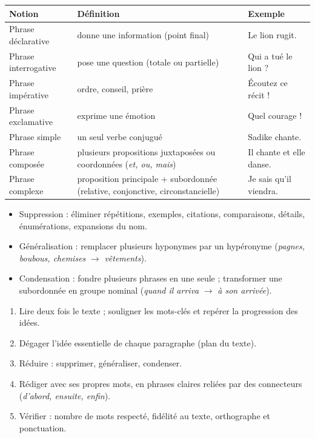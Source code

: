 \documentclass[11pt]{article}
\newcommand{\cle}[1]{{\popxbold\color{popdark}#1}}
\begin{document}
\begin{aretenir}
\begin{center}
\begin{tabularx}{\linewidth}{|l|X|X|}
\hline
\rowcolor{popblueL} \textbf{Notion} & \textbf{Définition} & \textbf{Exemple} \\
\hline
Phrase déclarative & donne une information (point final) & Le lion rugit. \\
\hline
Phrase interrogative & pose une question (totale ou partielle) & Qui a tué le lion ? \\
\hline
Phrase impérative & ordre, conseil, prière & Écoutez ce récit ! \\
\hline
Phrase exclamative & exprime une émotion & Quel courage ! \\
\hline
Phrase simple & un seul verbe conjugué & Sadike chante. \\
\hline
Phrase composée & plusieurs propositions juxtaposées ou coordonnées (\emph{et, ou, mais}) & Il chante et elle danse. \\
\hline
Phrase complexe & proposition principale + subordonnée (relative, conjonctive, circonstancielle) & Je sais qu'il viendra. \\
\hline
\end{tabularx}
\end{center}
\end{aretenir}

\begin{aretenir}
\begin{itemize}
  \item \cle{Suppression} : éliminer répétitions, exemples, citations, comparaisons, détails, énumérations, expansions du nom.
  \item \cle{Généralisation} : remplacer plusieurs hyponymes par un hypéronyme (\emph{pagnes, boubous, chemises} $\rightarrow$ \emph{vêtements}).
  \item \cle{Condensation} : fondre plusieurs phrases en une seule ; transformer une subordonnée en groupe nominal (\emph{quand il arriva} $\rightarrow$ \emph{à son arrivée}).
\end{itemize}
\end{aretenir}

\begin{methode}
\begin{enumerate}
  \item Lire deux fois le texte ; souligner les mots-clés et repérer la progression des idées.
  \item Dégager l'idée essentielle de chaque paragraphe (plan du texte).
  \item Réduire : supprimer, généraliser, condenser.
  \item Rédiger avec ses propres mots, en phrases claires reliées par des connecteurs (\emph{d'abord, ensuite, enfin}).
  \item Vérifier : nombre de mots respecté, fidélité au texte, orthographe et ponctuation.
\end{enumerate}
\end{methode}
\end{document}
